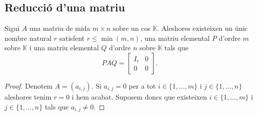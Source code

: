 \documentclass[../../Main.tex]{subfiles}
\begin{document}
	\subsection{Reducció d'una matriu}
	\begin{theorem}
		\label{thm:Teorema de la PAQ-reducció}
		Sigui \(A\) una matriu de mida \(m\times n\) sobre un cos \(\mathbb{K}\). Aleshores existeixen un únic nombre natural \(r\) satisfent \(r\leq\min(m,n)\), una matriu elemental \(P\) d'ordre \(m\) sobre \(\mathbb{K}\) i una matriu elemental \(Q\) d'ordre \(n\) sobre \(\mathbb{K}\) tals que
		\[PAQ=\left[\begin{array}{c|c}
		I_{r} & 0\\\hline
		0 & 0
		\end{array}\right].\]
		\begin{proof}
			Denotem \(A=(a_{i,j})\). Si \(a_{i,j}=0\) per a tot \(i\in\{1,\dots,m\}\) i \(j\in\{1,\dots,n\}\) aleshores tenim \(r=0\) i hem acabat. Suposem doncs que existeixen \(i\in\{1,\dots,m\}\) i \(j\in\{1,\dots,n\}\) tals que \(a_{i,j}\neq0\).
			

\end{proof}
\end{theorem}
\end{document}
